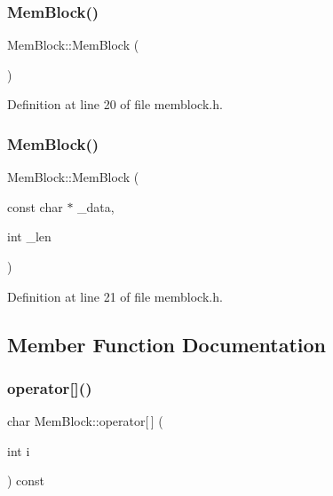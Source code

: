 \subsubsection{\texorpdfstring{Mem\+Block()}{MemBlock()}\hspace{0.1cm}{\footnotesize\ttfamily [1/2]}}
{\footnotesize\ttfamily Mem\+Block\+::\+Mem\+Block (\begin{DoxyParamCaption}{ }\end{DoxyParamCaption})\hspace{0.3cm}{\ttfamily [inline]}}



Definition at line 20 of file memblock.\+h.

\mbox{\label{class_mem_block_af2613f2a070cab85addfe23daa90c4fb}} 
\subsubsection{\texorpdfstring{Mem\+Block()}{MemBlock()}\hspace{0.1cm}{\footnotesize\ttfamily [2/2]}}
{\footnotesize\ttfamily Mem\+Block\+::\+Mem\+Block (\begin{DoxyParamCaption}\item[{const char $\ast$}]{\+\_\+data,  }\item[{int}]{\+\_\+len }\end{DoxyParamCaption})\hspace{0.3cm}{\ttfamily [inline]}}



Definition at line 21 of file memblock.\+h.



\subsection{Member Function Documentation}
\mbox{\label{class_mem_block_aef890e4e96c0a7e2e1da525388ba02cd}} 
\subsubsection{\texorpdfstring{operator[]()}{operator[]()}}
{\footnotesize\ttfamily char Mem\+Block\+::operator\mbox{[}$\,$\mbox{]} (\begin{DoxyParamCaption}\item[{int}]{i }\end{DoxyParamCaption}) const\hspace{0.3cm}{\ttfamily [inline]}}



